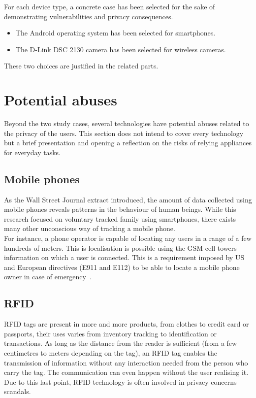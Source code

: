 For each device type, a concrete case has been selected for the sake of demonstrating
vulnerabilities and privacy consequences.
\begin{itemize}
\item The Android operating system has been selected for smartphones.
\item The D-Link DSC 2130 camera has been selected for wireless cameras.
\end{itemize}
These two choices are justified in the related parts.

\section{Potential abuses}

Beyond the two study cases, several technologies have potential abuses related to the privacy of the users.
This section does not intend to cover every technology but a brief presentation and opening a reflection on the risks of relying appliances for everyday tasks.\\

\subsection{Mobile phones}

As the Wall Street Journal extract introduced, the amount of data collected using mobile phones reveals patterns in the behaviour of human beings.
While this research focused on voluntary tracked family using smartphones, there exists many other unconscious way of tracking a mobile phone.\\

For instance, a phone operator is capable of locating any users in a range of a few hundreds of meters.
This is localisation is possible using the GSM cell towers information on which a user is connected.
This is a requirement imposed by US and European directives (E911 and E112) to be able to locate a mobile phone owner in case of emergency~\cite{e112-recom}.

\subsection{RFID}

RFID tags are present in more and more products, from clothes to credit card or passports, their uses varies from inventory tracking to identification or transactions.
As long as the distance from the reader is sufficient (from a few centimetres to meters depending on the tag), an RFID tag enables the transmission of information without any interaction needed from the person who carry the tag.
The communication can even happen without the user realising it.
Due to this last point, RFID technology is often involved in privacy concerns scandals.\\

